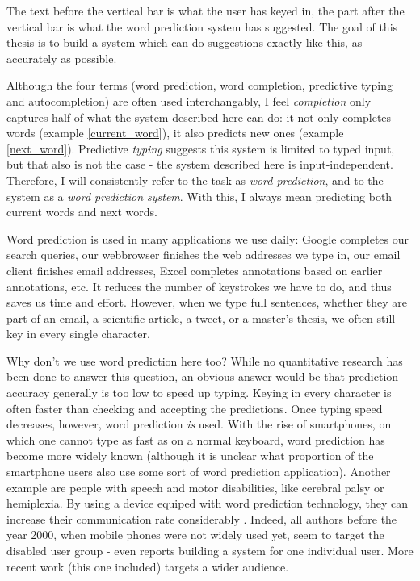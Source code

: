 \documentclass[12pt]{article}
\begin{document}
The text before the vertical bar is what the user has keyed in, the part after the vertical bar is what the word prediction system has suggested. The goal of this thesis is to build a system which can do suggestions exactly like this, as accurately as possible. 

Although the four terms (word prediction, word completion, predictive typing and autocompletion) are often used interchangably, I feel \emph{completion} only captures half of what the system described here can do: it not only completes words (example \ref{current_word}), it also predicts new ones (example \ref{next_word}). Predictive \emph{typing} suggests this system is limited to typed input, but that also is not the case - the system described here is input-independent. Therefore, I will consistently refer to the task as \emph{word prediction}, and to the system as a \emph{word prediction system}. With this, I always mean predicting both current words and next words.

Word prediction is used in many applications we use daily: Google completes our search queries, our webbrowser finishes the web addresses we type in, our email client finishes email addresses, Excel completes annotations based on earlier annotations, etc. It reduces the number of keystrokes we have to do, and thus saves us time and effort. However, when we type full sentences, whether they are part of an email, a scientific article, a tweet, or a master's thesis, we often still key in every single character. 

Why don't we use word prediction here too? While no quantitative research has been done to answer this question, an obvious answer would be that prediction accuracy generally is too low to speed up typing. Keying in every character is often faster than checking and accepting the predictions. Once typing speed decreases, however, word prediction \emph{is} used. With the rise of smartphones,  on which one  cannot type as fast as on a normal keyboard, word prediction has become more widely known  (although it is unclear what proportion of the smartphone users also use some sort of word prediction application). Another example are  people with speech and motor disabilities, like cerebral palsy or hemiplexia. By using a device equiped with word prediction technology, they can increase their communication rate considerably \cite{Garay-Vitoria+06}. Indeed, all authors before the year 2000, when mobile phones were not widely used yet, seem to target the disabled user group -  even reports building a system for one individual user. More recent work (this one included) targets a wider audience.
\end{document}
